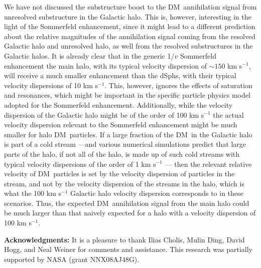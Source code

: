 \documentclass[aps,prd,twocolumn,amsmath,amssymb,floatfix,nofootinbib,10pt]{revtex4}
\newcommand{\DM}{DM}
\newcommand{\dSphs}{dSphs}
\begin{document}
We have not discussed the substructure boost to the \DM\ annihilation
signal from unresolved substructure in the Galactic halo. This is,
however, interesting in the light of the Sommerfeld enhancement, since
it might lead to a different prediction about the relative magnitudes
of the annihilation signal coming from the resolved Galactic halo and
unresolved halo, as well from the resolved substructures in the
Galactic halos. It is already clear that in the generic 1/$v$
Sommerfeld enhancement the main halo, with its typical velocity
dispersion of $\sim\!150$ km s$^{-1}$, will receive a much smaller
enhancement than the \dSphs, with their typical velocity dispersions
of 10 km s$^{-1}$. This, however, ignores the effects of saturation
and resonances, which might be important in the specific particle
physics model adopted for the Sommerfeld enhancement. Additionally,
while the velocity dispersion of the Galactic halo might be of the
order of 100 km s$^{-1}$ the actual velocity dispersion relevant to
the Sommerfeld enhancement might be much smaller for halo \DM\
particles. If a large fraction of the \DM\ in the Galactic halo is
part of a cold stream ---and various numerical simulations predict
that large parts of the halo, if not all of the halo, is made up of
such cold streams with typical velocity dispersions of the order of 1
km s$^{-1}$ \cite{1999MNRAS.307..495H,2003MNRAS.339..834H}--- then the
relevant relative velocity of \DM\ particles is set by the velocity
dispersion of particles in the stream, and not by the velocity
dispersion of the streams in the halo, which is what the 100 km
s$^{-1}$ Galactic halo velocity dispersion corresponds to in these
scenarios. Thus, the expected \DM\ annihilation signal from the main
halo could be much larger than that naively expected for a halo with a
velocity dispersion of 100 km s$^{-1}$.

{\bf Acknowledgments:} It is a pleasure to thank Ilias Cholis, Mulin
Ding, David Hogg, and Neal Weiner for comments and assistance. This
research was partially supported by NASA (grant NNX08AJ48G).




\end{document}
